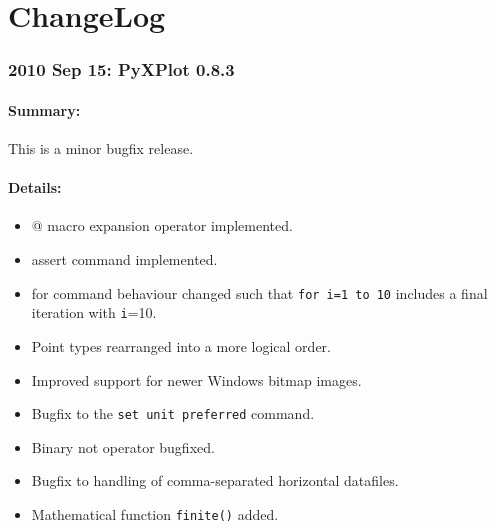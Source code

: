 %
%
%
%
%



\chapter{ChangeLog}

\subsection*{2010 Sep 15: PyXPlot 0.8.3}

\subsubsection*{Summary:}

This is a minor bugfix release.

\subsubsection*{Details:}

\begin{itemize}
\item @ macro expansion operator implemented.
\item assert command implemented.
\item for command behaviour changed such that {\tt for i=1 to 10} includes a final iteration with {\tt i}=10.
\item Point types rearranged into a more logical order.
\item Improved support for newer Windows bitmap images.
\item Bugfix to the {\tt set unit preferred} command.
\item Binary not operator bugfixed.
\item Bugfix to handling of comma-separated horizontal datafiles.
\item Mathematical function {\tt finite()} added.
\end{itemize}

